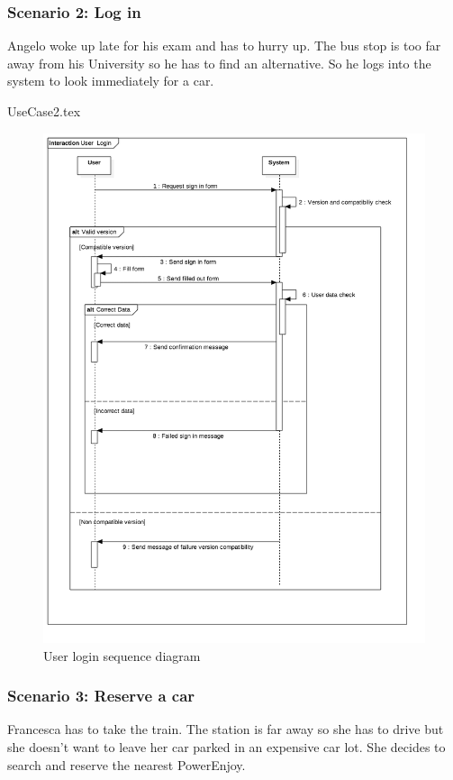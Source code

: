 \documentclass[12pt]{article}
\begin{document}
		\subsubsection{Scenario 2: Log in}
		Angelo woke up late for his exam and has to hurry up. The bus stop is too far away 
		from his University so he has to find an alternative. So he logs into the system to
		look immediately for a car.
		
		\FloatBarrier
		{UseCase2.tex}
		\newpage
		\begin{figure}[htbp]
		 \caption{User login sequence diagram}
		\includegraphics[scale=0.49]{Images/SequenceDiagram/UserLogin.png}
 	 	\end{figure}
 	 	\clearpage
		
		\subsubsection{Scenario 3: Reserve a car}
		Francesca has to take the train. The station is far away so she has to drive but she
		doesn't want to leave her car parked in an expensive car lot. She decides to search 
		and reserve the nearest PowerEnjoy.
		
\end{document}
